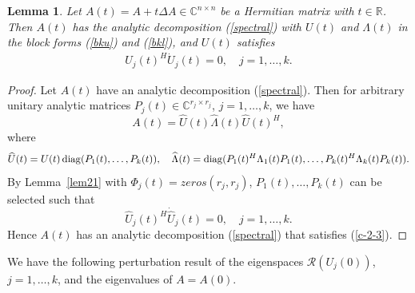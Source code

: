 \documentclass[11pt,a4paper]{article}
\numberwithin{equation}{section}
\newcommand {\setC}  {{\mathbb C}}
\newtheorem{Lemma}{Lemma}[section]
\newcommand {\wh} {\widehat}
\newcommand {\diag}  {\mathop{\rm diag}\nolimits}
\begin{document}
\begin{Lemma}\label{lem22}
Let $A(t)=A+t\Delta A\in\mathbb{C}^{n\times n}$ be a Hermitian matrix with $t\in{\mathbb R}$. Then
$A(t)$ has the analytic decomposition (\ref{spectral}) with
$U(t)$ and $\Lambda(t)$ in the block forms (\ref{bku}) and (\ref{bkl}), and $U(t)$
satisfies
\begin{eqnarray}\label{c-2-3}
U_j(t)^H\dot U_j(t)=0,\quad j=1,\ldots,k.
\end{eqnarray}
\end{Lemma}
\begin{proof}
Let $A(t)$ have an analytic decomposition (\ref{spectral}). Then for
arbitrary unitary analytic  matrices  $P_j(t)\in{\setC}^{r_j\times r_j}$, $j=1,\ldots,k$,
we have
\[
A(t)=\wh U(t)\wh\Lambda(t)\wh U(t)^H,
\]
where
\[
\wh U(t)=U(t)\diag(P_1(t),\ldots,P_k(t)),
\quad \wh \Lambda(t)=\diag(P_1(t)^H\Lambda_1(t)P_1(t),\ldots,
P_k(t)^H\Lambda_k(t)P_k(t)).
\]
By Lemma~\ref{lem21} with $\Phi_j(t)=zeros(r_j, r_j)$, $P_1(t),\ldots,P_k(t)$ can be selected such that
\[
\wh U_j(t)^H\dot {\wh U}_j(t)=0,\quad j=1,\dots,k.
\]
Hence $A(t)$ has an analytic  decomposition (\ref{spectral}) that satisfies   (\ref{c-2-3}).
\end{proof}

\medskip

We have  the following perturbation result of the eigenspaces ${\mathcal R}(U_j(0))$,
$j=1,\ldots,k$, and the eigenvalues of $A=A(0)$.\vskip 2mm
\end{document}

